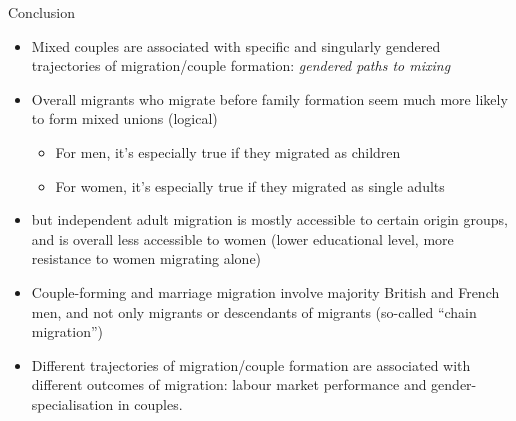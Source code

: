 \documentclass[
  ignorenonframetext,
]{beamer}
\providecommand{\tightlist}{%
  \setlength{\itemsep}{0pt}\setlength{\parskip}{0pt}}\usepackage{longtable,booktabs,array}
\begin{document}
\begin{frame}{Conclusion}
\protect\hypertarget{conclusion}{}
\begin{itemize}
\tightlist
\item
  Mixed couples are associated with specific and singularly gendered
  trajectories of migration/couple formation: \emph{gendered paths to
  mixing}
\item
  Overall migrants who migrate before family formation seem much more
  likely to form mixed unions (logical)

  \begin{itemize}
  \tightlist
  \item
    For men, it's especially true if they migrated as children
  \item
    For women, it's especially true if they migrated as single adults
  \end{itemize}
\item
  but independent adult migration is mostly accessible to certain origin
  groups, and is overall less accessible to women (lower educational
  level, more resistance to women migrating alone)
\item
  Couple-forming and marriage migration involve majority British and
  French men, and not only migrants or descendants of migrants
  (so-called ``chain migration'')
\item
  Different trajectories of migration/couple formation are associated
  with different outcomes of migration: labour market performance and
  gender-specialisation in couples.
\end{itemize}
\end{frame}
\end{document}
